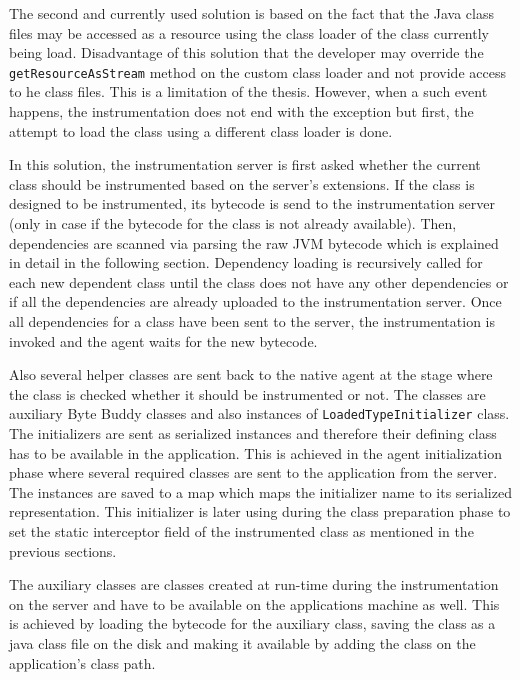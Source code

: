 The second and currently used solution is based on the fact that the Java class files may be accessed as a resource using the class loader of the class currently being load. Disadvantage of this solution that the developer may override the \texttt{getResourceAsStream} method on the custom class loader and not provide access to he class files. This is a limitation of the thesis. However, when a such event happens, the instrumentation does not end with the exception but first, the attempt to load the class using a different class loader is done. 

In this solution, the instrumentation server is first asked whether the current class should be instrumented based on the server's extensions. If the class is designed to be instrumented, its bytecode is send to the instrumentation server (only in case if the bytecode for the class is not already available). Then, dependencies are scanned via parsing the raw JVM bytecode which is explained in detail in the following section. Dependency loading is recursively called for each new dependent class until the class does not have any other dependencies or if all the dependencies are already uploaded to the instrumentation server. Once all dependencies for a class have been sent to the server, the instrumentation is invoked and the agent waits for the new bytecode. 

 Also several helper classes are sent back to the native agent at the stage where the class is checked whether it should be instrumented or not. The classes are auxiliary Byte Buddy classes and also instances of \texttt{LoadedTypeInitializer} class. The initializers are sent as serialized 
instances and therefore their defining class has to be available in the application. This is achieved in the agent initialization phase where several required classes are sent to the application from the server. The instances are saved to a map which maps the initializer name to its serialized representation. This initializer is later using during the class preparation phase to set the static interceptor field of the instrumented class as mentioned in the previous sections.

The auxiliary classes are classes created at run-time during the instrumentation on the server and have to be available on the applications machine as well. This is achieved by loading the bytecode for the auxiliary class, saving the class as a java class file on the disk and making it available by adding the class on the application's class path.

